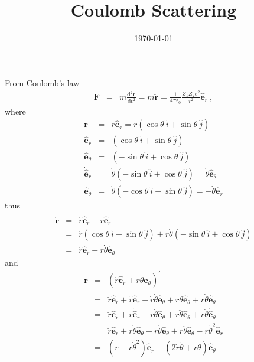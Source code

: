 \documentclass[12pt,a4paper]{article}
\title{Coulomb Scattering}
\author{}
\date{\today}
\renewcommand{\vec}[1]{\boldsymbol{#1}}
\newcommand{\dif}{\mathrm{d}}
\begin{document}
\maketitle
From Coulomb's law
\begin{eqnarray}
\vec{F} &=& m\frac{\dif^2 \vec{r}}{\dif t^2} = m\ddot{\vec{r}} = \frac{1}{4\pi \epsilon_0} \frac{Z_1 Z_2e^2}{r^2} \vec{\hat{e}}_r ~, 
\end{eqnarray}
where
\begin{eqnarray*}
 \vec{r} &=& r \vec{\hat{e}}_r = r(\cos \theta ~\hat{i} +\sin \theta~\hat{j}) \\
\vec{\hat{e}}_r &=& (\cos \theta ~\hat{i} +\sin \theta~\hat{j}) \\
\vec{\hat{e}}_\theta &=& (-\sin \theta ~\hat{i} +\cos \theta ~\hat{j}) \\
\vec{\dot{\hat{e}}}_r &=& \dot{\theta} (-\sin \theta ~\hat{i} +\cos \theta~\hat{j}) = \dot{\theta} \vec{\hat{e}}_\theta \\
\vec{\dot{\hat{e}}}_\theta &=& \dot{\theta}(-\cos \theta ~\hat{i} -\sin \theta ~\hat{j}) = -\dot{\theta}\vec{\hat{e}}_r
\end{eqnarray*}
thus 
\begin{eqnarray*}
\dot{\vec{r}} &=& \dot{r} \vec{\hat{e}}_r + r\vec{ \dot{\hat{e}}}_r \\
&=& \dot{r} (\cos \theta ~\hat{i} +\sin \theta ~\hat{j}) + r \dot{\theta} (-\sin \theta~\hat{i} +\cos \theta ~\hat{j}) \\
&=& \dot{r} \vec{\hat{e}}_r  + r \dot{\theta} \vec{\hat{e}}_\theta
\end{eqnarray*}
and
\begin{eqnarray*}
\ddot{\vec{r}} &=& (\dot{r} \vec{\hat{e}}_r  + r \dot{\theta} \vec{\hat{e}}_\theta)^\prime \\
&=& \ddot{r} \vec{\hat{e}}_r +\dot{r} \vec{\dot{\hat{e}}}_r +\dot{r} \dot{\theta} \vec{\hat{e}}_\theta +r \ddot{\theta} \vec{\hat{e}}_\theta +r \dot{\theta} \vec{\dot{\hat{e}}}_\theta \\
&=& \ddot{r} \vec{\hat{e}}_r +\dot{r} \vec{\dot{\hat{e}}}_r +\dot{r} \dot{\theta} \vec{\hat{e}}_\theta +r \ddot{\theta} \vec{\hat{e}}_\theta +r \dot{\theta} \vec{\dot{\hat{e}}}_\theta \\
&=& \ddot{r} \vec{\hat{e}}_r +\dot{r} \dot{\theta} \vec{\hat{e}}_\theta +\dot{r} \dot{\theta} \vec{\hat{e}}_\theta +r \ddot{\theta} \vec{\hat{e}}_\theta -r \dot{\theta}^2 \hat{\vec{e}}_r \\
&=& (\ddot{r} -r \dot{\theta}^2) \hat{\vec{e}}_r +(2\dot{r} \dot{\theta} +r\ddot{\theta} )\vec{\hat{e}}_\theta
\end{eqnarray*}
\end{document}
